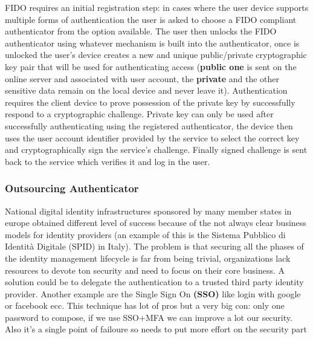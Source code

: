     FIDO requires an initial registration step: in cases where the user device supports multiple forms of authentication the user is asked to choose a FIDO compliant authenticator from the option available. The user then unlocks the FIDO authenticator using whatever mechanism is built into the authenticator, once is unlocked the user's device creates a new and unique public/private cryptographic key pair that will be used for authenticating access (\textbf{public one} is sent on the online server and associated with user account, the \textbf{private} and the other sensitive data remain on the local device and never leave it). Authentication requires the client device to prove possession of the private key by successfully respond to a cryptographic challenge. Private key can only be used after successfully authenticating using the registered authenticator, the device then uses the user account identifier provided by the service to select the correct key and cryptographically sign the service's challenge. Finally signed challenge is sent back to the service which verifies it and log in the user.
    
    \subsubsection{Outsourcing Authenticator}
    National digital identity infrastructures sponsored by many member states in europe obtained different level of success because of the not always clear business models for identity providers (an example of this is the Sistema Pubblico di Identità Digitale (SPID) in Italy). The problem is that securing all the phases of the identity management lifecycle is far from being trivial, organizations lack resources to devote ton security and need to focus on their core business. A solution could be to delegate the authentication to a trusted third party identity provider. Another example are the Single Sign On \textbf{(SSO)} like login with google or facebook ecc. This technique has lot of pros but a very big con: only one password to compose, if we use SSO+MFA we can improve a lot our security.
    Also it's a single point of failoure so needs to put more effort on the security part